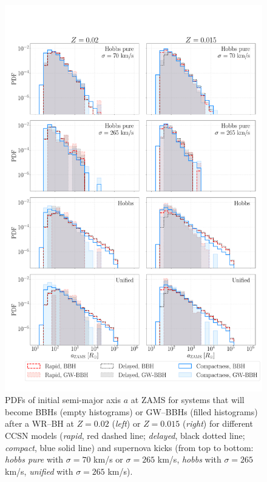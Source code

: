 \documentclass[a4paper,titlepage]{book}     	%
\begin{document}
\begin{appendices}
\begin{figure}
	\centering
	\includegraphics[width=\textwidth]{./images/proga.pdf}	
	\caption{PDFs of initial semi-major axis $a$ at ZAMS for systems that will become BBHs (empty histograms) or GW--BBHs (filled histograms) after a WR--BH at $Z=0.02$ (\emph{left}) or $Z=0.015$ (\emph{right}) for different CCSN models (\emph{rapid}, red dashed line; \emph{delayed}, black dotted line; \emph{compact}, blue solid line) and supernova kicks (from top to bottom: \emph{hobbs pure} with $\sigma = 70$ km/s or $\sigma = 265$ km/s, \emph{hobbs} with $\sigma = 265$ km/s, \emph{unified} with $\sigma = 265$ km/s).}\label{fig:resultsaprog}
\end{figure}









\end{appendices}
\end{document}

